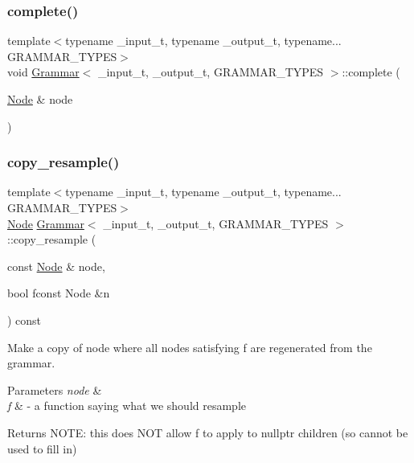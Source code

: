 \mbox{\label{class_grammar_a1524560f792f87da632c21f665666d21}} 
\subsubsection{\texorpdfstring{complete()}{complete()}}
{\footnotesize\ttfamily template$<$typename \+\_\+input\+\_\+t, typename \+\_\+output\+\_\+t, typename... G\+R\+A\+M\+M\+A\+R\+\_\+\+T\+Y\+P\+ES$>$ \\
void \hyperlink{class_grammar}{Grammar}$<$ \+\_\+input\+\_\+t, \+\_\+output\+\_\+t, G\+R\+A\+M\+M\+A\+R\+\_\+\+T\+Y\+P\+ES $>$\+::complete (\begin{DoxyParamCaption}\item[{\hyperlink{class_node}{Node} \&}]{node }\end{DoxyParamCaption})\hspace{0.3cm}{\ttfamily [inline]}}

\mbox{\label{class_grammar_a9ce6fefd39e27641085efc3ad6a3b077}} 
\subsubsection{\texorpdfstring{copy\+\_\+resample()}{copy\_resample()}}
{\footnotesize\ttfamily template$<$typename \+\_\+input\+\_\+t, typename \+\_\+output\+\_\+t, typename... G\+R\+A\+M\+M\+A\+R\+\_\+\+T\+Y\+P\+ES$>$ \\
\hyperlink{class_node}{Node} \hyperlink{class_grammar}{Grammar}$<$ \+\_\+input\+\_\+t, \+\_\+output\+\_\+t, G\+R\+A\+M\+M\+A\+R\+\_\+\+T\+Y\+P\+ES $>$\+::copy\+\_\+resample (\begin{DoxyParamCaption}\item[{const \hyperlink{class_node}{Node} \&}]{node,  }\item[{bool }]{fconst Node \&n }\end{DoxyParamCaption}) const\hspace{0.3cm}{\ttfamily [inline]}}

Make a copy of node where all nodes satisfying f are regenerated from the grammar. 
\begin{DoxyParams}{Parameters}
{\em node} & \\
\hline
{\em f} & -\/ a function saying what we should resample \\
\hline
\end{DoxyParams}
\begin{DoxyReturn}{Returns}
N\+O\+TE\+: this does N\+OT allow f to apply to nullptr children (so cannot be used to fill in)
\end{DoxyReturn}
\mbox{\label{class_grammar_ab0bae5bff5a5a8f97116ae49eb6d3a15}} 
